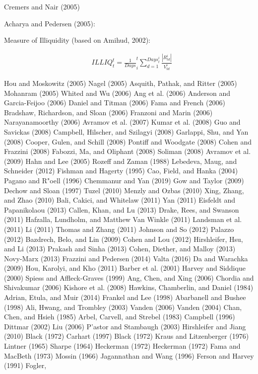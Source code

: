 \documentclass[
  letterpaper,
  DIV=11,
  numbers=noendperiod]{scrreprt}
\begin{document}
Cremers and Nair (2005)

Acharya and Pedersen (2005):

Measure of Illiquidity (based on Amihud, 2002):

\begin{align}
&ILLIQ_t^t=\frac{1}{Days}_i^t \sum_{d=1}^{Days_t^i} \frac{|R_{td}^i|}{V_{td}^i}
\end{align}
\label{Equation:acharya2005assetEquation11}

Hou and Moskowitz (2005) Nagel (2005) Asquith, Pathak, and Ritter (2005)
Mohanram (2005) Whited and Wu (2006) Ang et al. (2006) Anderson and
Garcia-Feijoo (2006) Daniel and Titman (2006) Fama and French (2006)
Bradshaw, Richardson, and Sloan (2006) Franzoni and Marin (2006)
Narayanamoorthy (2006) Avramov et al. (2007) Kumar et al. (2008) Guo and
Savickas (2008) Campbell, Hilscher, and Szilagyi (2008) Garlappi, Shu,
and Yan (2008) Cooper, Gulen, and Schill (2008) Pontiff and Woodgate
(2008) Cohen and Frazzini (2008) Fabozzi, Ma, and Oliphant (2008)
Soliman (2008) Avramov et al. (2009) Hahn and Lee (2005) Rozeff and
Zaman (1988) Lebedeva, Maug, and Schneider (2012) Fishman and Hagerty
(1995) Cao, Field, and Hanka (2004) Pagano and R"oell (1996) Chemmanur
and Yan (2019) Gow and Taylor (2009) Dechow and Sloan (1997) Tuzel
(2010) Menzly and Ozbas (2010) Xing, Zhang, and Zhao (2010) Bali,
Cakici, and Whitelaw (2011) Yan (2011) Eisfeldt and Papanikolaou (2013)
Callen, Khan, and Lu (2013) Drake, Rees, and Swanson (2011) Hafzalla,
Lundholm, and Matthew Van Winkle (2011) Landsman et al. (2011) Li (2011)
Thomas and Zhang (2011) Johnson and So (2012) Palazzo (2012) Bazdrech,
Belo, and Lin (2009) Cohen and Lou (2012) Hirshleifer, Hsu, and Li
(2013) Prakash and Sinha (2013) Cohen, Diether, and Malloy (2013)
Novy-Marx (2013) Frazzini and Pedersen (2014) Valta (2016) Da and
Warachka (2009) Hou, Karolyi, and Kho (2011) Barber et al. (2001) Harvey
and Siddique (2000) Spiess and Affleck-Graves (1999) Ang, Chen, and Xing
(2006) Chordia and Shivakumar (2006) Kishore et al. (2008) Hawkins,
Chamberlin, and Daniel (1984) Adrian, Etula, and Muir (2014) Frankel and
Lee (1998) Abarbanell and Bushee (1998) Ali, Hwang, and Trombley (2003)
Vanden (2006) Vanden (2004) Chan, Chen, and Hsieh (1985) Arbel, Carvell,
and Strebel (1983) Campbell (1996) Dittmar (2002) Liu (2006) P'astor and
Stambaugh (2003) Hirshleifer and Jiang (2010) Black (1972) Carhart
(1997) Black (1972) Kraus and Litzenberger (1976) Lintner (1965) Sharpe
(1964) Heckerman (1972) Heckerman (1972) Fama and MacBeth (1973) Mossin
(1966) Jagannathan and Wang (1996) Ferson and Harvey (1991) Fogler,
\end{document}

